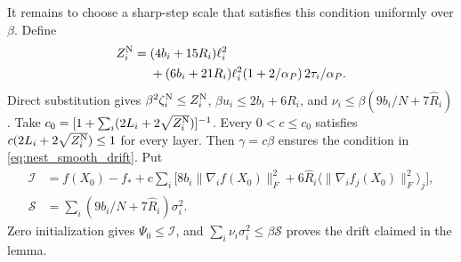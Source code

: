 \begin{codex}
\begin{paperproof}
It remains to choose a sharp-step scale that satisfies this condition
uniformly over $\beta$. Define
\begin{align*}
 Z_i^{\rm N}={}&(4b_i+15R_i)\ell_i^2\\
 &+(6b_i+21R_i)\ell_i^2(1+2/\alpha_P)\,2\tau_i/\alpha_P.
\end{align*}
Direct substitution gives
$\beta^2\zeta_i^{\rm N}\le Z_i^{\rm N}$,
$\beta u_i\le2b_i+6R_i$, and
$\nu_i\le\beta(9b_i/N+7\widehat R_i)$.
Take
$c_0=[1+\sum_i(2L_i+2\sqrt{Z_i^{\rm N}})]^{-1}$.
Every $0<c\le c_0$ satisfies
$c(2L_i+2\sqrt{Z_i^{\rm N}})\le1$ for every layer.
Then $\gamma=c\beta$ ensures the condition in
\eqref{eq:nest_smooth_drift}. Put
\begin{align*}
 \mathcal I&=f(X_0)-f_*+
 c\sum_i\bigl[8b_i\|\nabla_i f(X_0)\|_F^2
 +6\widehat R_i\langle\|\nabla_i f_j(X_0)\|_F^2\rangle_j\bigr],\\
 \mathcal S&=\sum_i(9b_i/N+7\widehat R_i)\sigma_i^2.
\end{align*}
Zero initialization gives $\Psi_0\le\mathcal I$, and
$\sum_i\nu_i\sigma_i^2\le\beta\mathcal S$ proves the drift claimed
in the lemma.
\end{paperproof}


\end{codex}
